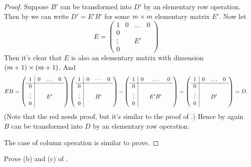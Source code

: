 \begin{proof}
Suppose \(B'\) can be transformed into \(D'\) by an elementary row operation.
Then by  we can write \(D' = E'B'\) for some \(m \times m\) elementary matrix \(E'\).
Now let
\[
    E = \left(\begin{array}{c|ccc}
        1 & 0 & \ldots & 0 \\
        \hline 0 & & & \\
        \vdots & & E' & \\
        0 & & &
    \end{array}\right)
\]
Then it's clear that \(E\) is also an elementary matrix with dimension \((m + 1) \times (m + 1)\).
And
\[
    EB = \left(\begin{array}{c|ccc}
        1 & 0 & \ldots & 0 \\
        \hline 0 & & & \\
        \vdots & & E' & \\
        0 & & &
    \end{array}\right) \left(\begin{array}{c|ccc}
        1 & 0 & \cdots & 0 \\
        \hline 0 & & & \\
        \vdots & & B' & \\
        0 & & &
    \end{array}\right) \\
    \RED{=} \left(\begin{array}{c|ccc}
        1 & 0 & \ldots & 0 \\
        \hline 0 & & & \\
        \vdots & & E' B' & \\
        0 & & &
    \end{array}\right) =
    \left(\begin{array}{c|ccc}
        1 & 0 & \ldots & 0 \\
        \hline 0 & & & \\
        \vdots & & D' & \\
        0 & & &
    \end{array}\right)
    = D.
\]
(Note that the red \RED{\(=\)} needs proof, but it's similar to the proof of .)
Hence by  again \(B\) can be transformed into \(D\) by an elementary row operation.

The case of column operation is similar to prove.
\end{proof}

\begin{exercise} \label{exercise 3.2.13}
Prove (b) and (c) of .
\end{exercise}

